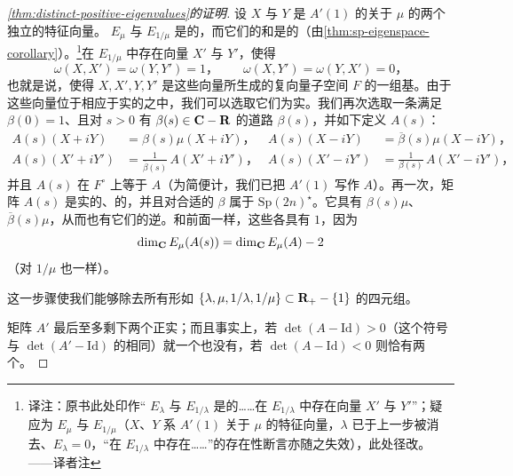 \begin{proof}[\cref{thm:distinct-positive-eigenvalues}的证明]
设 $X$ 与 $Y$ 是 $A'(1)$ 的关于\trEigenvalue{} $\mu$ 的两个独立的特征向量。\trGeneralizedEigenspace{} $E_\mu$ 与 $E_{1/\mu}$ 是\trIsotropic{}的，而它们的和是\trSymplectic{}的（由\cref{thm:sp-eigenspace-corollary}）。\footnote{译注：原书此处印作“\trGeneralizedEigenspace{} $E_\lambda$ 与 $E_{1/\lambda}$ 是\trIsotropic{}的……在 $E_{1/\lambda}$ 中存在向量 $X'$ 与 $Y'$”；疑应为 $E_\mu$ 与 $E_{1/\mu}$（$X$、$Y$ 系 $A'(1)$ 关于 $\mu$ 的特征向量，$\lambda$ 已于上一步被消去、$E_\lambda=0$，“在 $E_{1/\lambda}$ 中存在……”的存在性断言亦随之失效），此处径改。——译者注}在 $E_{1/\mu}$ 中存在向量 $X'$ 与 $Y'$，使得
\[
\omega(X,X')=\omega(Y,Y')=1\text{，}\qquad
\omega(X,Y')=\omega(Y,X')=0\text{，}
\]
也就是说，使得 $X,X',Y,Y'$ 是这些向量所生成的复向量子空间 $F$ 的一组\trSymplectic{}基。由于这些向量位于相应于实\trEigenvalue{}的\trGeneralizedEigenspace{}之中，我们可以选取它们为实。我们再次选取一条满足 $\beta(0)=1$、且对 $s>0$ 有 $\beta(s)\in\mathbf{C}-\mathbf{R}$ 的道路 $\beta(s)$，并如下定义 $A(s)$：
\[
\begin{aligned}
A(s)(X+iY)&=\beta(s)\mu(X+iY)\text{，} & A(s)(X-iY)&=\overline{\beta}(s)\mu(X-iY)\text{，}\\
A(s)(X'+iY')&=\frac{1}{\overline{\beta}(s)}\,A(X'+iY')\text{，} & A(s)(X'-iY')&=\frac{1}{\beta(s)}\,A(X'-iY')\text{，}
\end{aligned}
\]
并且 $A(s)$ 在 $F^\circ$ 上等于 $A$（为简便计，我们已把 $A'(1)$ 写作 $A$）。再一次，矩阵 $A(s)$ 是实的、\trSymplectic{}的，并且对合适的 $\beta$ 属于 $\mathrm{Sp}(2n)^\star$。它具有\trEigenvalue{} $\beta(s)\mu$、$\overline{\beta}(s)\mu$，从而也有它们的逆。和前面一样，这些\trEigenvalue{}各具有\trMultiplicity{} $1$，因为
\[
\dim_{\mathbf{C}} E_\mu(A(s))=\dim_{\mathbf{C}} E_\mu(A)-2
\]
（对 $1/\mu$ 也一样）。

这一步骤使我们能够除去所有形如 $\{\lambda,\mu,1/\lambda,1/\mu\}\subset\mathbf{R}_+-\{1\}$ 的\trEigenvalue{}四元组。

矩阵 $A'$ 最后至多剩下两个正实\trEigenvalue；而且事实上，若 $\det(A-\mathrm{Id})>0$（这个符号与 $\det(A'-\mathrm{Id})$ 的相同）就一个也没有，若 $\det(A-\mathrm{Id})<0$ 则恰有两个。
\end{proof}

